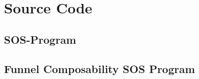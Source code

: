 \chapter{Source Code}
\label{AppendixB}
\section{SOS-Program}
\label{sec:sos-program-implementation}


\section{Funnel Composability SOS Program}
\label{sec:funnel-composability-program-sos}

